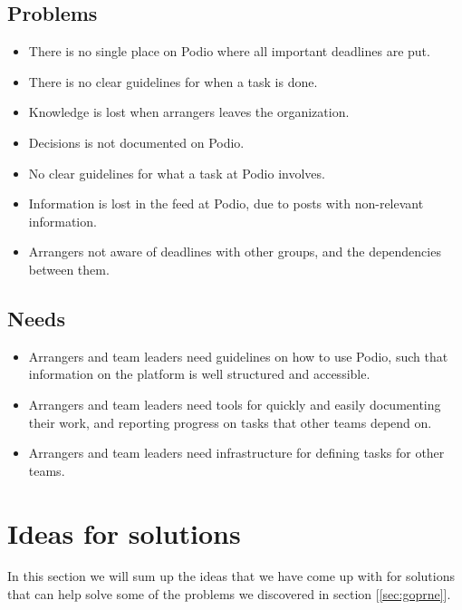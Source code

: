 \subsection{Problems}
\label{subsec:problems}
\begin{itemize}
    \item There is no single place on Podio where all important deadlines are put.
    \item There is no clear guidelines for when a task is done.
    \item Knowledge is lost when arrangers leaves the organization.
    \item Decisions is not documented on Podio.
    \item No clear guidelines for what a task at Podio involves.
    \item Information is lost in the feed at Podio, due to posts with
    non-relevant information.
    \item Arrangers not aware of deadlines with other groups, and the
    dependencies between them.
\end{itemize}

\subsection{Needs}
\label{subsec:needs}
\begin{itemize}
    \item Arrangers and team leaders need guidelines on how to use Podio, such that information on the platform is well structured and accessible.
    \item Arrangers and team leaders need tools for quickly and easily documenting their work, and reporting progress on tasks that other teams depend on.
    \item Arrangers and team leaders need infrastructure for defining tasks for other teams.
\end{itemize}

\section{Ideas for solutions}
\label{sec:ideas}
In this section we will sum up the ideas that we have come up with for solutions
that can help solve some of the problems we discovered in section [\ref{sec:goprne}].

